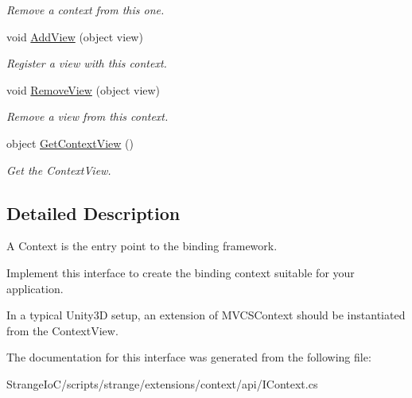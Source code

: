 \begin{DoxyCompactItemize}
\begin{DoxyCompactList}\small\item\em Remove a context from this one. \end{DoxyCompactList}\item 
\hypertarget{interfacestrange_1_1extensions_1_1context_1_1api_1_1_i_context_a885a609302ae470de7c1ae15a3285308}{void \hyperlink{interfacestrange_1_1extensions_1_1context_1_1api_1_1_i_context_a885a609302ae470de7c1ae15a3285308}{Add\-View} (object view)}\label{interfacestrange_1_1extensions_1_1context_1_1api_1_1_i_context_a885a609302ae470de7c1ae15a3285308}

\begin{DoxyCompactList}\small\item\em Register a view with this context. \end{DoxyCompactList}\item 
\hypertarget{interfacestrange_1_1extensions_1_1context_1_1api_1_1_i_context_afe786060cd387a581974444dc21231bf}{void \hyperlink{interfacestrange_1_1extensions_1_1context_1_1api_1_1_i_context_afe786060cd387a581974444dc21231bf}{Remove\-View} (object view)}\label{interfacestrange_1_1extensions_1_1context_1_1api_1_1_i_context_afe786060cd387a581974444dc21231bf}

\begin{DoxyCompactList}\small\item\em Remove a view from this context. \end{DoxyCompactList}\item 
\hypertarget{interfacestrange_1_1extensions_1_1context_1_1api_1_1_i_context_aabe56e5b66c8d670507117774d094587}{object \hyperlink{interfacestrange_1_1extensions_1_1context_1_1api_1_1_i_context_aabe56e5b66c8d670507117774d094587}{Get\-Context\-View} ()}\label{interfacestrange_1_1extensions_1_1context_1_1api_1_1_i_context_aabe56e5b66c8d670507117774d094587}

\begin{DoxyCompactList}\small\item\em Get the Context\-View. \end{DoxyCompactList}\end{DoxyCompactItemize}


\subsection{Detailed Description}
A Context is the entry point to the binding framework. 

Implement this interface to create the binding context suitable for your application.

In a typical Unity3\-D setup, an extension of M\-V\-C\-S\-Context should be instantiated from the Context\-View. 

The documentation for this interface was generated from the following file\-:\begin{DoxyCompactItemize}
\item 
Strange\-Io\-C/scripts/strange/extensions/context/api/I\-Context.\-cs\end{DoxyCompactItemize}
